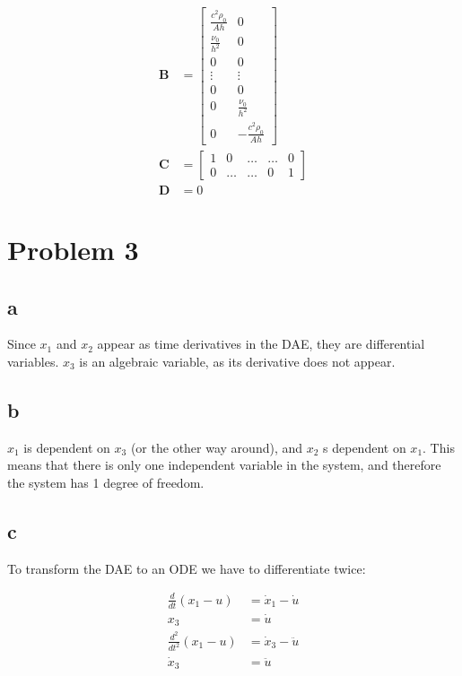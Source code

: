 \documentclass{article}
\begin{document}
\begin{align*}
    \mathbf{B} &= \begin{bmatrix}
        \frac{c^2\rho_0}{Ah} & 0\\
        \frac{\nu_0}{h^2} & 0\\
        0 & 0\\
        \vdots & \vdots \\
        0 & 0 \\
        0 & \frac{\nu_0}{h^2}\\
        0 & -\frac{c^2\rho_0}{Ah}
    \end{bmatrix}\\
    \mathbf{C} &= \begin{bmatrix}
        1 & 0 & \hdots & \hdots & 0\\
        0 & \hdots & \hdots & 0 & 1
    \end{bmatrix}\\
    \mathbf{D} &= 0
\end{align*}


\section{Problem 3}

\subsection{a}

Since $x_1$ and $x_2$ appear as time derivatives in the DAE, they are differential variables. $x_3$ is an algebraic variable, as its derivative does not appear. 

\subsection{b}

$x_1$ is dependent on $x_3$ (or the other way around), and $x_2$ s dependent on $x_1$. This means that there is only one independent variable in the system, and therefore the system has 1 degree of freedom. 

\subsection{c}

To transform the DAE to an ODE we have to differentiate twice:

\begin{align*}
    \frac{d}{dt}(x_1 - u) &= \dot x_1 -\dot u\\
    x_3 &= \dot u \\
    \frac{d^2}{dt^2}(x_1 - u) &= \dot x_3 - \ddot u\\
    \dot x_3 &= \ddot u
\end{align*}
\end{document}
